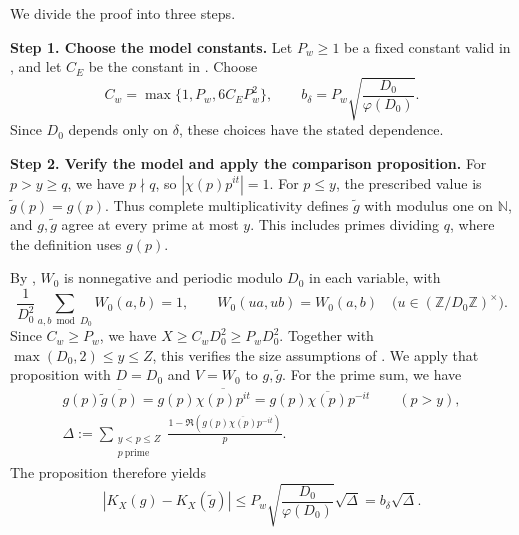 \documentclass[twoside]{aomart}
\makeatletter
\theoremstyle{paperplain}
\theoremstyle{paperdefinition}
\renewenvironment{proof}[1][\proofname]{\par\pushQED{\qed}%
  \normalfont\topsep6\p@\@plus3\p@\relax\trivlist
  \item[\hskip\labelsep\itshape #1\@addpunct{.}]\ignorespaces
}{\popQED\endtrivlist\@endpefalse}
\newcommand{\N}{\mathbb N}
\numberwithin{equation}{section}
\makeatother
\begin{document}
\begin{proof}
We divide the proof into three steps.

\medskip
\noindent\textbf{Step 1. Choose the model constants.}
Let $P_w\ge1$ be a fixed constant valid in
, and let $C_E$ be the constant
in . Choose
\begin{equation}
 C_w=\max\{1,P_w,6C_EP_w^2\},
 \qquad b_\delta=P_w\sqrt{\frac{D_0}{\varphi(D_0)}}.
 \label{con:model-comparison-constants}
\end{equation}
Since $D_0$ depends only on $\delta$, these choices have the
stated dependence.

\medskip
\noindent\textbf{Step 2. Verify the model and apply the comparison proposition.}
For $p>y\ge q$, we have $p\nmid q$, so $|\chi(p)p^{it}|=1$.
For $p\le y$, the prescribed value is $\widetilde g(p)=g(p)$.
Thus complete multiplicativity defines $\widetilde g$ with modulus
one on $\N$, and $g,\widetilde g$ agree at every prime at most $y$.
This includes primes dividing $q$, where the definition uses $g(p)$.

By , $W_0$ is nonnegative and periodic modulo
$D_0$ in each variable, with
\begin{equation*}
 \frac1{D_0^2}\sum_{a,b\bmod D_0}W_0(a,b)=1,\qquad
 W_0(ua,ub)=W_0(a,b)\quad\bigl(u\in(\mathbb Z/D_0\mathbb Z)^\times\bigr).
\end{equation*}
Since $C_w\ge P_w$, we have $X\ge C_wD_0^2\ge P_wD_0^2$.
Together with $\max(D_0,2)\le y\le Z$, this verifies the size
assumptions of .
We apply that proposition with $D=D_0$ and $V=W_0$ to
$g,\widetilde g$.
For the prime sum, we have
\begin{equation*}
 \begin{gathered}
 g(p)\overline{\widetilde g(p)}
 =g(p)\overline{\chi(p)p^{it}}
 =g(p)\overline{\chi(p)}p^{-it}\qquad(p>y),\\
 \Delta:=\sum_{\substack{y<p\le Z\\p\ \mathrm{prime}}}
       \frac{1-\Re(g(p)\overline{\chi(p)}p^{-it})}{p}.
 \end{gathered}
\end{equation*}
The proposition therefore yields
\begin{equation}
 |K_X(g)-K_X(\widetilde g)|
 \le P_w\sqrt{\frac{D_0}{\varphi(D_0)}}\sqrt\Delta
 =b_\delta\sqrt\Delta.
 \label{con:model-proposition-application}
\end{equation}


\end{proof}
\end{document}
